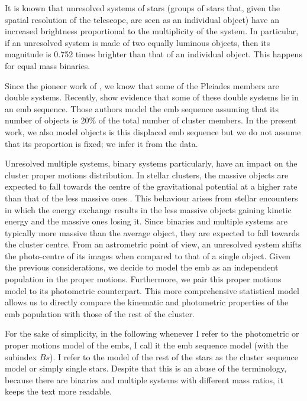 It is known that unresolved systems of stars (groups of stars that, given the spatial resolution of the telescope, are seen as an individual object) have an increased brightness proportional to the multiplicity of the system. In particular, if an unresolved system is made of two equally luminous objects, then its magnitude is 0.752 times brighter than that of an individual object. This happens for equal mass binaries.

Since the pioneer work of \citet{Trumpler1921}, we know that some of the Pleiades members are double systems. Recently, \citet{Sarro2014} show evidence that some of these double systems lie in an \gls{emb} sequence. Those authors model the \gls{emb} sequence assuming that its number of objects is 20\% of the total number of cluster members. In the present work, we also model objects is this displaced \gls{emb} sequence  but we do not assume that its proportion is fixed; we infer it from the data. 

Unresolved multiple systems, binary systems particularly, have an impact on the cluster proper motions distribution. In stellar clusters, the massive objects are expected to fall towards the centre of the gravitational potential at a higher rate than that of the less massive ones {\cite[see for example][p. 556]{Binney2008}}. This behaviour arises from stellar encounters in which the energy exchange results in the less massive objects gaining kinetic energy and the massive ones losing it. {Since binaries and multiple systems are typically more massive than the average object, they are expected to fall towards the cluster centre.} From an astrometric point of view, an unresolved system shifts the photo-centre of its images when compared to that of a single object. Given the previous considerations, we decide to model the \gls{emb} as an independent population in the proper motions. Furthermore, we pair this proper motions model to its photometric counterpart. This more comprehensive statistical model allows us to directly compare the kinematic and photometric properties of the \gls{emb} population with those of the rest of the cluster. 

For the sake of simplicity, in the following whenever I refer to the photometric or proper motions model of the \gls{emb}s, I call it the \gls{emb} sequence model (with the subindex $Bs$). I refer to the model of the rest of the stars as the cluster sequence model or simply single stars. Despite that this is an abuse of the terminology, because there are binaries and multiple systems with different mass ratios, it keeps the text more readable.

